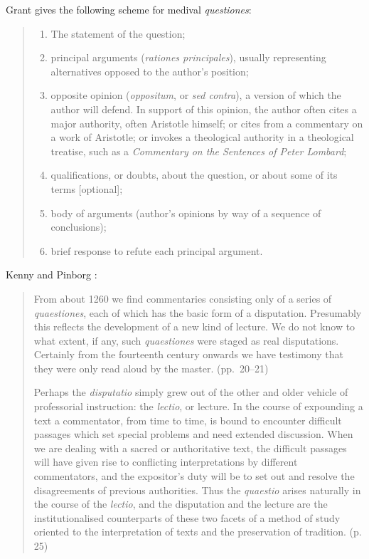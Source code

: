 \documentclass{amsart}
\theoremstyle{definition}
\begin{document}
Grant \cite[pp.~106--107]{grant2001} gives the following scheme for medival {\em questiones}:
\begin{quote}
\begin{enumerate}[label={\arabic*.}]
\item The statement of the question;
\item principal arguments ({\em rationes principales}), usually representing alternatives opposed to the author's
position;
\item opposite opinion ({\em oppositum}, or {\em sed contra}), a version of which the author will defend. In support
of this opinion, the author often cites a major authority, often Aristotle himself; or cites from a commentary on a work
of Aristotle; or invokes a theological authority in a theological treatise, such as a {\em Commentary on the Sentences of Peter Lombard};
\item qualifications, or doubts, about the question, or about some of its terms [optional];
\item body of arguments (author's opinions by way of a sequence of conclusions);
\item brief response to refute each principal argument.
\end{enumerate}
\end{quote}


 Kenny and Pinborg \cite{kenny}:
 \begin{quote}
 From about 1260 we find commentaries consisting only of a series of {\em quaestiones}, each of which
 has the basic form of a disputation. Presumably this reflects the development of a new kind of lecture.
 We do not know to what extent, if any, such {\em quaestiones} were staged as real disputations. Certainly
 from the fourteenth century onwards we have testimony that they were only read
 aloud by the master. (pp.~20--21)
 
 Perhaps the {\em disputatio} simply grew out of the other and older vehicle of professorial instruction:
 the {\em lectio}, or lecture. In the course of expounding a text a commentator, from time to time, is bound
 to encounter difficult passages which set special problems and need extended discussion. When we are dealing
 with a sacred or authoritative text, the difficult passages will have given rise to conflicting interpretations
 by different commentators, and the expositor's duty will be to set out and resolve the disagreements of previous
 authorities. Thus the {\em quaestio} arises naturally in the course of the {\em lectio}, and the disputation and
 the lecture are the institutionalised counterparts of these two facets of a method of study oriented
 to the interpretation of texts and the preservation of tradition. (p. 25)
 \end{quote}
 
\end{document}
